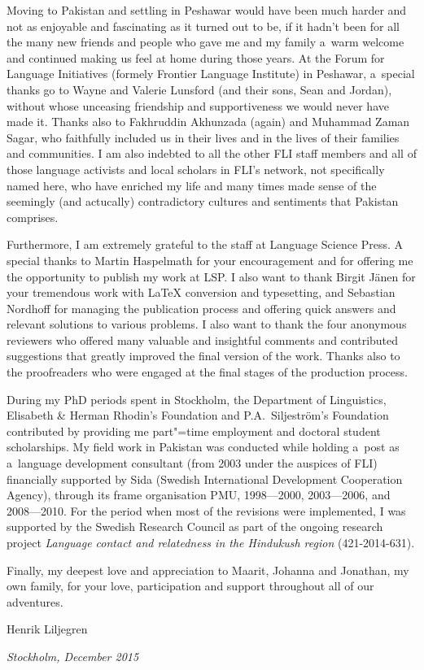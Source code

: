 \begin{refsection}
Moving to Pakistan and settling in Peshawar would have been much harder and not as enjoyable and fascinating as it turned out to be, if it hadn't been for all the many new friends and people who gave me and my family a~warm welcome and continued making us feel at home during those years. At the Forum for Language Initiatives (formely Frontier Language Institute) in Peshawar, a~special thanks go to Wayne and Valerie Lunsford (and their sons, Sean and Jordan), without whose unceasing friendship and supportiveness we would never have made it. Thanks also to Fakhruddin Akhunzada (again) and Muhammad Zaman Sagar, who faithfully included us in their lives and in the lives of their families and communities. I am also indebted to all the other FLI staff members and all of those language activists and local scholars in FLI’s network, not specifically named here, who have enriched my life and many times made sense of the seemingly (and actucally) contradictory cultures and sentiments that Pakistan comprises.


Furthermore, I am extremely grateful to the staff at Language Science Press. A special thanks to Martin Haspelmath for your encouragement and for offering me the opportunity to publish my work at LSP. I also want to thank Birgit Jänen for your tremendous work with LaTeX conversion and typesetting, and Sebastian Nordhoff for managing the publication process and offering quick answers and relevant solutions to various problems. I also want to thank the four anonymous reviewers who offered many valuable and insightful comments and contributed suggestions that greatly improved the final version of the work. Thanks also to the proofreaders who were engaged at the final stages of the production process.


During my PhD periods spent in Stockholm, the Department of Linguistics, Elisabeth \& Herman Rhodin's Foundation and P.A.~Siljeström's Foundation contributed by providing me part"=time employment and doctoral student scholarships. My field work in Pakistan was conducted while holding a~post as a~language development consultant (from 2003 under the auspices of FLI) financially supported by Sida (Swedish International Development Cooperation Agency), through its frame organisation PMU, 1998—2000, 2003—2006, and 2008—2010. For the period when most of the revisions were implemented, I was supported by the Swedish Research Council as part of the ongoing research project \textit{Language contact and relatedness in the Hindukush region} (421-2014-631).


Finally, my deepest love and appreciation to Maarit, Johanna and Jonathan, my own family, for your love, participation and support throughout all of our adventures.




Henrik Liljegren


\textit{Stockholm, December 2015}


\printbibliography[heading=subbibliography]
\end{refsection}